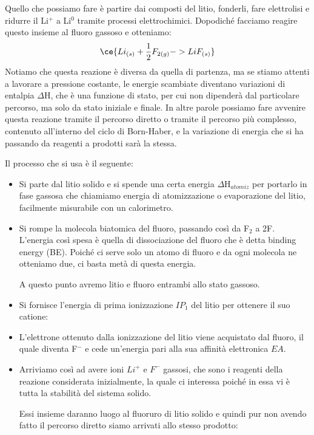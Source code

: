 Quello che possiamo fare è partire dai composti del litio, fonderli, fare elettrolisi e ridurre il Li$^+$ a Li$^0$ tramite processi elettrochimici. Dopodiché facciamo reagire questo insieme al fluoro gassoso e otteniamo:
$$\ce{Li_{(s)} + \frac{1}{2}F_{2(g)} -> LiF_{(s)}}$$
Notiamo che questa reazione è diversa da quella di partenza, ma se stiamo attenti a lavorare a pressione costante, le energie scambiate diventano variazioni di entalpia $\Delta$H, che è una funzione di stato, per cui non dipenderà dal particolare percorso, ma solo da stato iniziale e finale. In altre parole possiamo fare avvenire questa reazione tramite il percorso diretto o tramite il percorso più complesso, contenuto all'interno del ciclo di Born-Haber, e la variazione di energia che si ha passando da reagenti a prodotti sarà la stessa.

Il processo che si usa è il seguente:
\begin{itemize}
    \item Si parte dal litio solido e si spende una certa energia $\Delta\text{H}_{atomiz}$ per portarlo in fase gassosa che chiamiamo energia di atomizzazione o evaporazione del litio, facilmente misurabile con un calorimetro.
    \item Si rompe la molecola biatomica del fluoro, passando così da F$_2$ a 2F. L'energia così spesa è quella di dissociazione del fluoro che è detta binding energy (BE). Poiché ci serve solo un atomo di fluoro e da ogni molecola ne otteniamo due, ci basta metà di questa energia.
    
    A questo punto avremo litio e fluoro entrambi allo stato gassoso.
    \item Si fornisce l'energia di prima ionizzazione $IP_1$ del litio per ottenere il suo catione:
    
    \item L'elettrone ottenuto dalla ionizzazione del litio viene acquistato dal fluoro, il quale diventa F$^-$ e cede un'energia pari alla sua affinità elettronica $EA$.
    \item Arriviamo così ad avere ioni $Li^+$ e $F^-$ gassosi, che sono i reagenti della reazione considerata inizialmente, la quale ci interessa poiché in essa vi è tutta la stabilità del sistema solido.
    
    Essi insieme daranno luogo al fluoruro di litio solido e quindi pur non avendo fatto il percorso diretto siamo arrivati allo stesso prodotto:
\end{itemize}

